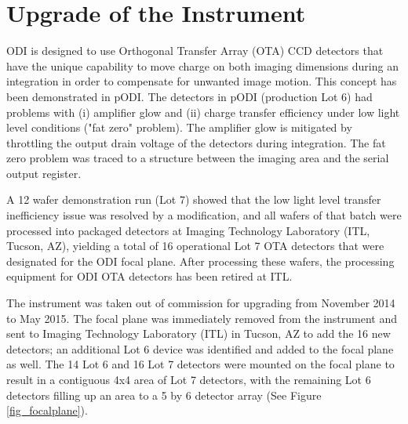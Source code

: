 \documentclass[]{spieman}
\begin{document}
\section{Upgrade of the Instrument} 

ODI is designed to use Orthogonal Transfer Array (OTA) CCD detectors that have
the unique capability to move charge on both imaging dimensions during an
integration in order to compensate for unwanted image motion. This concept has
been demonstrated in pODI.  The detectors in pODI (production Lot 6) had
problems with (i) amplifier glow and (ii)  charge transfer efficiency under low
light level conditions ("fat zero" problem). The amplifier glow is mitigated by
throttling the output drain voltage of the detectors during integration. The fat
zero problem was traced to a structure between the imaging area and the serial
output register.

A  12 wafer demonstration run (Lot 7) showed that the low light level transfer
inefficiency issue was resolved by a modification\cite{harbeck2014}, and all
wafers of that batch were processed into packaged detectors at Imaging
Technology Laboratory (ITL, Tucson, AZ),  yielding a total of 16 operational 
Lot 7 OTA detectors that were designated for the ODI focal plane. After 
processing these wafers, the processing equipment for ODI OTA detectors has been
retired at ITL.

The instrument was taken out of commission for upgrading from November 2014 to
May 2015. The focal plane was immediately removed from the instrument and sent
to  Imaging Technology Laboratory  (ITL) in Tucson, AZ to add the 16 new
detectors; an additional Lot 6 device was identified and added to the focal
plane as well. The 14 Lot 6 and 16 Lot 7 detectors were mounted on the focal
plane to result in a contiguous 4x4 area of Lot 7 detectors, with the remaining
Lot 6 detectors filling up an area to a 5 by 6 detector array (See Figure
\ref{fig_focalplane}).
\end{document}
